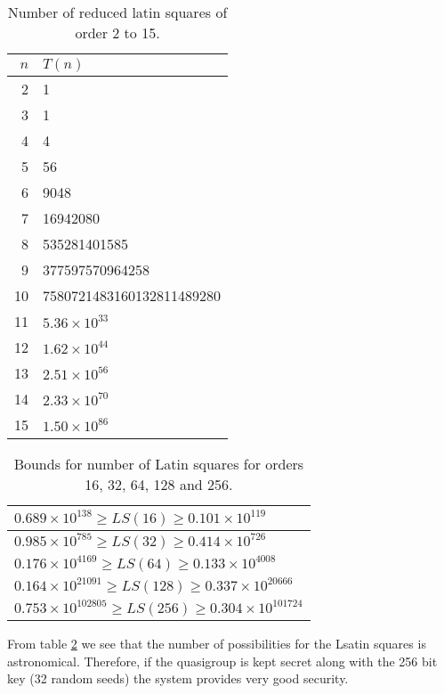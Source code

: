 \documentclass[conference]{IEEEtran}
\begin{document}
\begin{table}
\centering
\begin{tabular}{|r|l|}
\hline
$n$& $T(n)$\\ \hline
2& 1 \\\hline
3& 1 \\\hline
4& 4 \\\hline
5& 56 \\\hline
6& 9048 \\\hline
7& 16942080 \\\hline
8& 535281401585 \\\hline
9& 377597570964258 \\\hline
10& 7580721483160132811489280 \\\hline
11& $5.36\times 10^{33}$\\\hline
12& $1.62\times 10^{44}$\\\hline
13& $2.51\times 10^{56}$\\\hline
14& $2.33\times 10^{70}$\\\hline
15& $1.50\times 10^{86}$\\\hline
\end{tabular}
\caption{Number of reduced latin squares of order 2 to 15.}
\vspace{-0.28in}
\label{latinSquaresTn}
\end{table}

\begin{table}
\centering
\begin{tabular}{|l|}
\hline
$0.689\times 10^{138}\geq LS(16)\geq 0.101\times 10^{119}$\\\hline
$0.985\times 10^{785}\geq LS(32)\geq 0.414\times 10^{726}$\\\hline
$0.176\times 10^{4169}\geq LS(64)\geq 0.133\times 10^{4008}$\\\hline
$0.164\times 10^{21091}\geq LS(128)\geq 0.337\times 10^{20666}$\\\hline
$0.753\times 10^{102805}\geq LS(256)\geq 0.304\times 10^{101724}$\\\hline
\end{tabular}
\caption{Bounds for number of Latin squares for orders 16, 32, 64, 128 and 256.}
\label{numberOfLatinSquares}
\end{table}

From table \ref{numberOfLatinSquares} we see that the number of possibilities for the Lsatin squares is astronomical. Therefore, if the quasigroup is kept secret along with the 256 bit key (32 random seeds) the system provides very good security.
\end{document}
